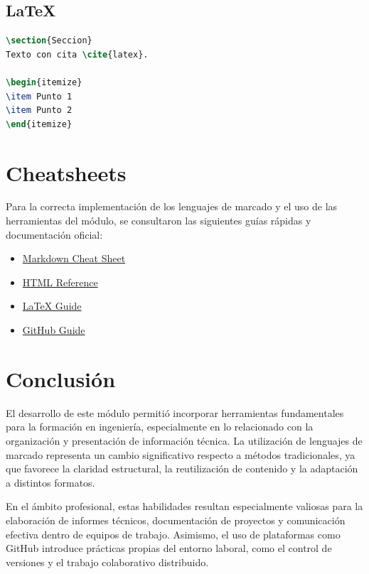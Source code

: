 \documentclass[runningheads]{llncs}
\begin{document}
\subsection{LaTeX}
\begin{lstlisting}[language=TeX, caption=Ejemplo LaTeX]
\section{Seccion}
Texto con cita \cite{latex}.

\begin{itemize}
\item Punto 1
\item Punto 2
\end{itemize}
\end{lstlisting}

\section{Cheatsheets}

Para la correcta implementación de los lenguajes de marcado y el uso de las herramientas del módulo, se consultaron las siguientes guías rápidas y documentación oficial:

\begin{itemize}
\item \href{https://www.markdownguide.org/cheat-sheet/}{Markdown Cheat Sheet} \cite{markdown}
\item \href{https://www.w3schools.com}{HTML Reference} \cite{html}
\item \href{https://www.overleaf.com/learn}{LaTeX Guide} \cite{latex}
\item \href{https://education.github.com}{GitHub Guide} \cite{git}
\end{itemize}

\section{Conclusión}
El desarrollo de este módulo permitió incorporar herramientas fundamentales para la formación en ingeniería, especialmente en lo relacionado con la organización y presentación de información técnica. La utilización de lenguajes de marcado representa un cambio significativo respecto a métodos tradicionales, ya que favorece la claridad estructural, la reutilización de contenido y la adaptación a distintos formatos.

En el ámbito profesional, estas habilidades resultan especialmente valiosas para la elaboración de informes técnicos, documentación de proyectos y comunicación efectiva dentro de equipos de trabajo. Asimismo, el uso de plataformas como GitHub introduce prácticas propias del entorno laboral, como el control de versiones y el trabajo colaborativo distribuido.
\end{document}

